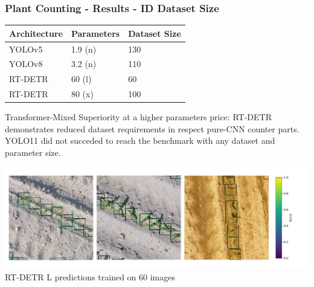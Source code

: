 \documentclass[aspectratio=43]{beamer}
\begin{document}
\begin{frame}
    \frametitle{\small Plant Counting - Results - ID Dataset Size}

    \begin{table}[H]
        \scriptsize
        \begin{tabularx}{\textwidth}{lXX}
        \toprule
        \textbf{Architecture} &\textbf{Parameters} & \textbf{Dataset Size} \\
        \midrule
        YOLOv5 & 1.9 (n) & 130 \\
        YOLOv8 & 3.2 (n) & 110 \\
        RT-DETR & 60 (l) & 60 \\
        RT-DETR & 80 (x) & 100 \\
        \bottomrule
        \end{tabularx}
    \end{table}

    \begin{block}{\scriptsize Transformer-Mixed Superiority at a higher parameters price:}
        \scriptsize
        RT-DETR demonstrates reduced dataset requirements in respect pure-CNN counter parts. YOLO11 did not succeded to reach the benchmark with any dataset and parameter size. 
    \end{block}

    \begin{center}
        \includegraphics[width=1\textwidth]{Imgs/many_shot_size_annotations.pdf}
        \tiny RT-DETR L predictions trained on 60 images
    \end{center}
\end{frame}
\end{document}
